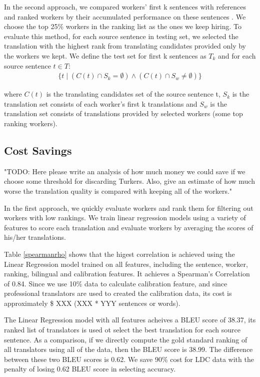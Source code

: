 \documentclass[11pt]{article}
\begin{document}
In the second approach, we compared workers' first k sentences with references and ranked workers by their accumulated performance on these sentences . We choose the top 25\% workers in the ranking list as the ones we keep hiring. To evaluate this method, for each source sentence in testing set, we selected the translation with the highest rank from translating candidates provided only by the workers we kept. We define the test set for first k sentences as $T_k$ and for each source sentence $t \in T$:
\begin{align*}
  \{ t \mid (C(t) \cap S_k = \emptyset)   \wedge (C(t) \cap S_w \neq \emptyset)    \}
\end{align*}

where $C(t)$ is the translating candidates set of the source sentence t, $S_k$ is the translation set consists of each worker's first k translations and $S_w$ is the translation set consists of translations provided by selected workers (some top ranking workers).
\subsection{Cost Savings}

"TODO: Here please write an analysis of how much money we could save if we choose some threshold for discarding Turkers.  Also, give an estimate of how much worse the translation quality is compared with keeping all of the workers."

In the first approach, we quickly evaluate workers and rank them for filtering out workers with low rankings. We train linear regression models using a variety of features to score each translation and evaluate workers by averaging the scores of his/her translations. 


Table \ref{spearmanrho} shows that the higest correlation is achieved using the Linear Regression model trained on all features, including the sentence, worker, ranking, bilingual and calibration features.  It achieves a Spearman's Correlation of 0.84.  Since we  use 10\% data to calculate calibration feature, and since professional translators are used to created the calibration data, its cost is approximately \$ XXX (XXX * YYY sentences or words). 

The Linear Regression model with all features acheives a BLEU score of 38.37, its ranked list of translators  is used ot select the best translation for each source sentence. As a comparison, if we directly compute the gold standard ranking of all translators using all of the data, then the BLEU score is 38.99. The difference between these two BLEU scores is 0.62. We save 90\% cost for LDC data with the penalty of losing 0.62 BLEU score in selecting accuracy.
\end{document}
